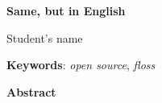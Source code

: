 \begin{otherlanguage}{english}

\begin{center}
    {\large\bfseries Same, but in English}\\
\end{center}
\begin{center}
    Student's name\\
\end{center}
\vspace{0.5cm}
\noindent\textbf{Keywords}: \textit{open source}, \textit{floss}
\vspace{0.7cm}



\noindent\textbf{Abstract}\\

\end{otherlanguage}